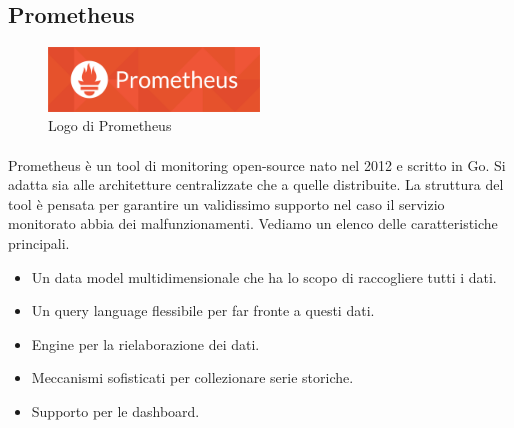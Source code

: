 \subsection{Prometheus}
\begin{figure}[h!]
	\centering
	\includegraphics[width=0.5\textwidth,keepaspectratio=true]{capitoli/imgs/prometheuslogo.png}
	\caption{Logo di Prometheus}
\end{figure}
\paragraph{}
Prometheus è un tool di monitoring open-source nato nel 2012 e scritto in Go. Si adatta sia alle architetture centralizzate che a quelle distribuite. La struttura del tool è pensata per garantire un validissimo supporto nel caso il servizio monitorato abbia dei malfunzionamenti. Vediamo un elenco delle caratteristiche principali.
\begin{itemize}
	\item Un data model multidimensionale che ha lo scopo di raccogliere tutti i dati.
	\item Un query language flessibile per far fronte a questi dati.
	\item Engine per la rielaborazione dei dati.
	\item Meccanismi sofisticati per collezionare serie storiche.
	\item Supporto per le dashboard.
\end{itemize}
